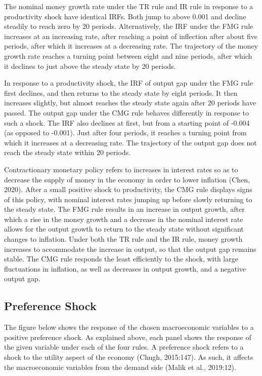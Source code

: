 \documentclass[11pt,preprint, authoryear]{elsarticle}
\numberwithin{equation}{section}
\numberwithin{figure}{section}
\numberwithin{table}{section}
\begin{document}
The nominal money growth rate under the TR rule and IR rule in response
to a productivity shock have identical IRFs. Both jump to above 0.001
and decline steadily to reach zero by 20 periods. Alternatively, the IRF
under the FMG rule increases at an increasing rate, after reaching a
point of inflection after about five periods, after which it increases
at a decreasing rate. The trajectory of the money growth rate reaches a
turning point between eight and nine periods, after which it declines to
just above the steady state by 20 periods.

In response to a productivity shock, the IRF of output gap under the FMG
rule first declines, and then returns to the steady state by eight
periods. It then increases slightly, but almost reaches the steady state
again after 20 periods have passed. The output gap under the CMG rule
behaves differently in response to such a shock. The IRF also declines
at first, but from a starting point of -0.004 (as opposed to -0.001).
Just after four periods, it reaches a turning point from which it
increases at a decreasing rate. The trajectory of the output gap does
not reach the steady state within 20 periods.

Contractionary monetary policy refers to increases in interest rates so
as to decrease the supply of money in the economy in order to lower
inflation (Chen, 2020). After a small positive shock to productivity,
the CMG rule displays signs of this policy, with nominal interest rates
jumping up before slowly returning to the steady state. The FMG rule
results in an increase in output growth, after which a rise in the money
growth and a decrease in the nominal interest rate allows for the output
growth to return to the steady state without significant changes to
inflation. Under both the TR rule and the IR rule, money growth
increases to accommodate the increase in output, so that the output gap
remains stable. The CMG rule responds the least efficiently to the
shock, with large fluctuations in inflation, as well as decreases in
output growth, and a negative output gap.

\hypertarget{preference-shock}{%
\subsection{Preference Shock}\label{preference-shock}}

The figure below shows the response of the chosen macroeconomic
variables to a positive preference shock. As explained above, each panel
shows the response of the given variable under each of the four rules. A
preference shock refers to a shock to the utility aspect of the economy
(Chugh, 2015:147). As such, it affects the macroeconomic variables from
the demand side (Malik et al., 2019:12).
\end{document}
